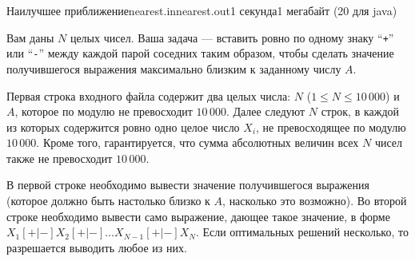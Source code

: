 \begin{problem}{Наилучшее приближение}{nearest.in}{nearest.out}{1 секунда}{1 мегабайт (20 для java)}

Вам даны $N$ целых чисел. Ваша задача --- вставить ровно по одному знаку
``\texttt{+}'' или ``\texttt{-}'' между каждой парой соседних таким образом,
чтобы сделать значение получившегося выражения максимально близким
к заданному числу $A$.

\InputFile

Первая строка входного файла содержит два целых числа: $N$ ($1 \le N\le 10\,000$)
и $A$, которое по модулю не превосходит $10\,000$.
Далее следуют $N$ строк, в каждой из которых содержится ровно одно целое число 
$X_i$, не превосходящее по модулю $10\,000$. Кроме того, гарантируется, что сумма
абсолютных величин всех $N$ чисел также не превосходит $10\,000$.

\OutputFile

В первой строке необходимо вывести значение получившегося выражения
(которое должно быть настолько близко к $A$, насколько это возможно).
Во второй строке необходимо вывести само выражение, дающее такое значение,
в форме $X_1[+|-]X_2[+|-]\ldots X_{N-1}[+|-]X_N$. Если 
оптимальных решений несколько,
то разрешается выводить любое из них.

\Example

\begin{example}
%
\end{example}

\end{problem}
